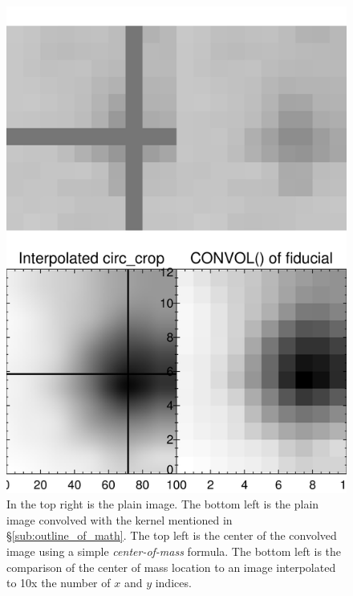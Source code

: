 \documentclass[10pt]{article}
\begin{document}
\begin{figure}[ht]
        \begin{minipage}{.45\textwidth}
            \centering
                \includegraphics[width=\linewidth]{plots_tables_images/cropcomp0.png}
                \caption{In the top right is the plain image. The bottom left is the plain image convolved with the kernel mentioned in \S \ref{sub:outline_of_math}. The top left is the center of the convolved image using a simple \emph{center-of-mass} formula. The bottom left is the comparison of the center of mass location to an image interpolated to 10x the number of $x$ and $y$ indices.}
        \end{minipage}
        \hspace{.5in}
        \begin{minipage}{.45\textwidth}
        \vspace{-.65in}

\end{minipage}
\end{figure}
\end{document}
